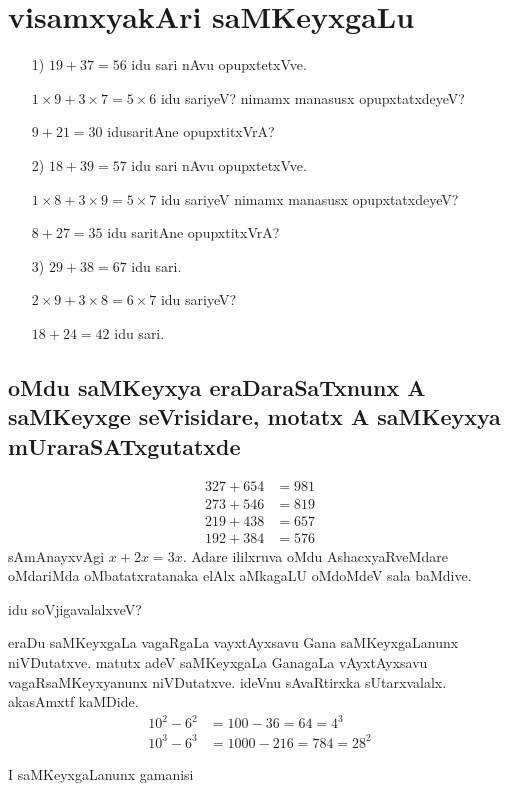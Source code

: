 \chapter{visamxyakAri saMKeyxgaLu}

\begin{itemize}
\item[{\rm 1)}] $19+37 = 56$ idu sari nAvu opupxtetxVve.

$1 \times 9+3 \times 7 = 5 \times 6 $ idu sariyeV? nimamx manasusx opupxtatxdeyeV?

$9+21 =30$ idusaritAne opupxtitxVrA?

\item[{\rm 2)}] $18+39 = 57$ idu sari nAvu opupxtetxVve.

$1 \times 8+3 \times 9 = 5 \times 7 $  idu sariyeV nimamx manasusx opupxtatxdeyeV?

$8 + 27 = 35$ idu saritAne opupxtitxVrA?

\item[{\rm 3)}] $29 + 38 = 67$ idu sari.

$2\times 9 + 3 \times 8 = 6 \times 7$ idu sariyeV?

$18+24 = 42$ idu sari.
\end{itemize}

\section*{oMdu saMKeyxya eraDaraSaTxnunx A saMKeyxge seVrisidare, motatx A saMKeyxya mUraraSATxgutatxde}
\begin{align*}
327+654 &= 981\\
273+546 &= 819\\
219+438 &= 657\\
192+384 &= 576
\end{align*}
sAmAnayxvAgi $x+2x=3x$. Adare ililxruva oMdu AshacxyaRveMdare oMdariMda oMbatatxratanaka elAlx aMkagaLU oMdoMdeV sala baMdive.

idu soVjigavalalxveV?

eraDu saMKeyxgaLa vagaRgaLa vayxtAyxsavu Gana saMKeyxgaLanunx niVDutatxve. matutx adeV saMKeyxgaLa GanagaLa vAyxtAyxsavu vagaRsaMKeyxyanunx niVDutatxve. ideVnu sAvaRtirxka sUtarxvalalx. akasAmxtf kaMDide.
\begin{align*}
10^2-6^2 &= 100-36 = 64 = 4^3\\
10^3-6^3 &= 1000-216 = 784 = 28^2
\end{align*}

I saMKeyxgaLanunx gamanisi

